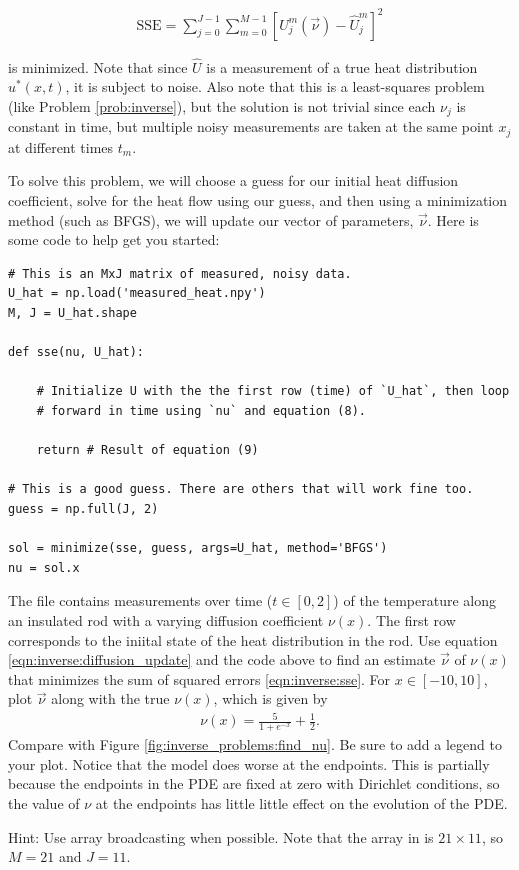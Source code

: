 \begin{align}
\text{SSE} = \sum_{j=0}^{J-1} \sum_{m=0}^{M-1} [U_j^m(\vec \nu) - \hat U_j^m]^2
\label{eqn:inverse:sse}
\end{align}

\noindent is minimized.
Note that since $\hat U$ is a measurement of a true heat distribution $u^*(x,t)$, it is subject to noise.
Also note that this is a least-squares problem (like Problem \ref{prob:inverse}), but the solution is not trivial since each $\nu_j$ is constant in time, but multiple noisy measurements are taken at the same point $x_j$ at different times $t_m$.

To solve this problem, we will choose a guess for our initial heat diffusion coefficient, solve for the heat flow using our guess, and then using a minimization method (such as BFGS), we will update our vector of parameters, $\vec \nu$. Here is some code to help get you started:

\begin{lstlisting}
# This is an MxJ matrix of measured, noisy data.
U_hat = np.load('measured_heat.npy')
M, J = U_hat.shape

def sse(nu, U_hat):

    # Initialize U with the the first row (time) of `U_hat`, then loop
    # forward in time using `nu` and equation (8).

    return # Result of equation (9)

# This is a good guess. There are others that will work fine too.
guess = np.full(J, 2)

sol = minimize(sse, guess, args=U_hat, method='BFGS')
nu = sol.x
\end{lstlisting}

\begin{problem}
The file  contains measurements over time ($t \in [0, 2]$) of the temperature along an insulated rod with a varying diffusion coefficient $\nu(x)$.
The first row corresponds to the iniital state of the heat distribution in the rod.
Use equation \eqref{eqn:inverse:diffusion_update} and the code above to find an estimate $\vec \nu$ of $\nu(x)$ that minimizes the sum of squared errors \eqref{eqn:inverse:sse}.
For $x \in [-10, 10]$, plot $\vec \nu$ along with the true $\nu(x)$, which is given by
\begin{align*}
\nu(x) = \frac{5}{1+e^{-x}}+\frac{1}{2}.
\end{align*}
Compare with Figure \ref{fig:inverse_problems:find_nu}.
Be sure to add a legend to your plot.
Notice that the model does worse at the endpoints.
This is partially because the endpoints in the PDE are fixed at zero with Dirichlet conditions, so the value of $\nu$ at the endpoints has little little effect on the evolution of the PDE.

Hint: Use array broadcasting when possible. Note that the array in  is $21 \times 11$, so $M = 21$ and $J = 11$.
\label{inverse_problems:varying_nu}
\end{problem}

